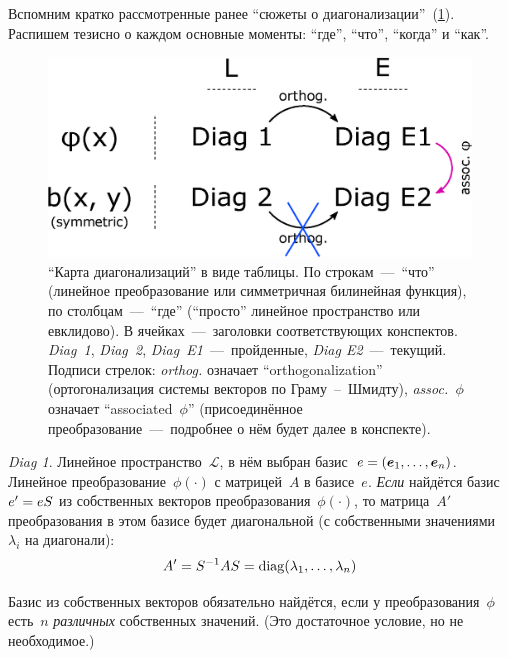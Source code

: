 \documentclass[a4paper,12pt]{article}
\theoremstyle{remark}
\begin{document}
  Вспомним кратко рассмотренные ранее ``сюжеты о диагонализации''~(\ref{fig:diag-scheme}).
  Распишем тезисно о каждом основные моменты: ``где'', ``что'', ``когда'' и ``как''.
  
  \begin{figure}[h]
    \centering
    
    \includegraphics[width=0.7\columnwidth]{diag-scheme}
    
    \caption{``Карта диагонализаций'' в виде таблицы. По строкам~---~``что'' (линейное преобразование или симметричная билинейная функция), по столбцам~---~``где'' (``просто'' линейное пространство или евклидово). В ячейках~---~заголовки соответствующих конспектов. \emph{Diag~1}, \emph{Diag~2}, \emph{Diag~E1}~---~пройденные, \emph{Diag E2}~---~текущий. Подписи стрелок: \emph{orthog.} означает ``orthogonalization'' (ортогонализация системы векторов по Граму~--~Шмидту), \emph{assoc.~$\phi$} означает ``associated~$\phi$'' (присоединённое преобразование~---~подробнее о нём будет далее в конспекте).}
    \label{fig:diag-scheme}
  \end{figure}
  
  \emph{Diag 1}.
  Линейное пространство~$\mathcal L$, в нём выбран базис~$e \hm= (\bds e_1, \ldots, \bds e_n)$.
  Линейное преобразование~$\phi(\cdot)$ с матрицей~$A$ в базисе~$e$.
  \emph{Если} найдётся базис~$e' \hm= e S$ из собственных векторов преобразования~$\phi(\cdot)$, то матрица~$A'$ преобразования в этом базисе будет диагональной (с собственными значениями~$\lambda_i$ на диагонали):
  \begin{equation}\label{eq:diag1-matrix-change}
    A' = S^{-1} A S = \operatorname{diag}(\lambda_1, \ldots, \lambda_n)
  \end{equation}
  
  Базис из собственных векторов обязательно найдётся, если у преобразования~$\phi$ есть~$n$ \emph{различных} собственных значений.
  (Это достаточное условие, но не необходимое.)
  
  \smallskip
  
\end{document}
